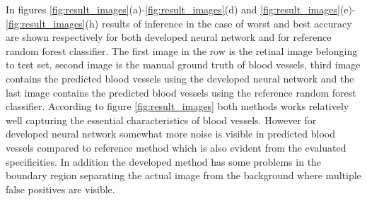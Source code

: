 \documentclass[aps,prb,10pt,twocolumn,groupedaddress]{revtex4-1}
\begin{document}
In figures \ref{fig:result_images}(a)-\ref{fig:result_images}(d) and \ref{fig:result_images}(e)-\ref{fig:result_images}(h) results of inference in the case of worst and best accuracy are shown respectively for both developed neural network and for reference random forest classifier. The first image in the row is the retinal image belonging to test set, second image is the manual ground truth of blood vessels, third image contains the predicted blood vessels using the developed neural network and the last image contains the predicted blood vessels using the reference random forest classifier. According to figure \ref{fig:result_images} both methods works relatively well capturing the essential characteristics of blood vessels. However for developed neural network somewhat more noise is visible in predicted blood vessels compared to reference method which is also evident from the evaluated specificities. In addition the developed method has some problems in the boundary region separating the actual image from the background where multiple false positives are visible.
\end{document}
